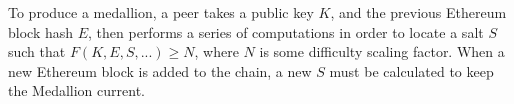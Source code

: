 To produce a medallion, a peer takes a public key $K$, and the previous Ethereum block hash $E$, then performs a series of computations in order to locate a salt $S$ such that $F(K, E, S, ...) \geq N$, where $N$ is some difficulty scaling factor. When a new Ethereum block is added to the chain, a new $S$ must be calculated to keep the Medallion current.

%







